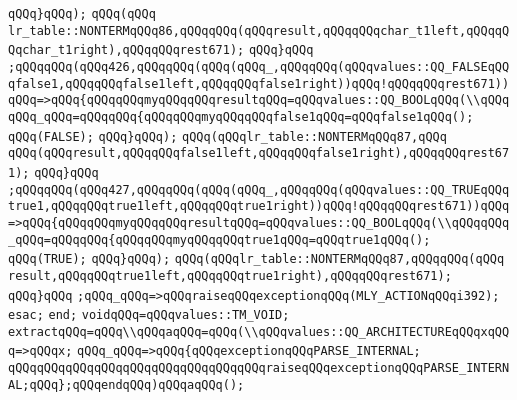 \verb|qQQq}qQQq);|\newline
\verb|qQQq(qQQq|\newline
\verb|lr_table::NONTERMqQQq86,qQQqqQQq(qQQqresult,qQQqqQQqchar_t1left,qQQqqQQqchar_t1right),qQQqqQQqrest671);|\newline
\verb|qQQq}qQQq|\newline
\verb|;qQQqqQQq(qQQq426,qQQqqQQq(qQQq(qQQq_,qQQqqQQq(qQQqvalues::QQ_FALSEqQQqfalse1,qQQqqQQqfalse1left,qQQqqQQqfalse1right))qQQq!qQQqqQQqrest671))qQQq=>qQQq{qQQqqQQqmyqQQqqQQqresultqQQq=qQQqvalues::QQ_BOOLqQQq(\\qQQqqQQq_qQQq=qQQqqQQq{qQQqqQQqmyqQQqqQQqfalse1qQQq=qQQqfalse1qQQq();|\newline
\verb|qQQq(FALSE);|\newline
\verb|qQQq}qQQq);|\newline
\verb|qQQq(qQQqlr_table::NONTERMqQQq87,qQQq|\newline
\verb|qQQq(qQQqresult,qQQqqQQqfalse1left,qQQqqQQqfalse1right),qQQqqQQqrest671);|\newline
\verb|qQQq}qQQq|\newline
\verb|;qQQqqQQq(qQQq427,qQQqqQQq(qQQq(qQQq_,qQQqqQQq(qQQqvalues::QQ_TRUEqQQqtrue1,qQQqqQQqtrue1left,qQQqqQQqtrue1right))qQQq!qQQqqQQqrest671))qQQq=>qQQq{qQQqqQQqmyqQQqqQQqresultqQQq=qQQqvalues::QQ_BOOLqQQq(\\qQQqqQQq_qQQq=qQQqqQQq{qQQqqQQqmyqQQqqQQqtrue1qQQq=qQQqtrue1qQQq();|\newline
\verb|qQQq(TRUE);|\newline
\verb|qQQq}qQQq);|\newline
\verb|qQQq(qQQqlr_table::NONTERMqQQq87,qQQqqQQq(qQQq|\newline
\verb|result,qQQqqQQqtrue1left,qQQqqQQqtrue1right),qQQqqQQqrest671);|\newline
\verb|qQQq}qQQq|\newline
\verb|;qQQq_qQQq=>qQQqraiseqQQqexceptionqQQq(MLY_ACTIONqQQqi392);|\newline
\verb|esac;|\newline
\verb|end;|\newline
\verb|voidqQQq=qQQqvalues::TM_VOID;|\newline
\verb|extractqQQq=qQQq\\qQQqaqQQq=qQQq(\\qQQqvalues::QQ_ARCHITECTUREqQQqxqQQq=>qQQqx;|\newline
\verb|qQQq_qQQq=>qQQq{qQQqexceptionqQQqPARSE_INTERNAL;|\newline
\verb|qQQqqQQqqQQqqQQqqQQqqQQqqQQqqQQqqQQqraiseqQQqexceptionqQQqPARSE_INTERNAL;qQQq};qQQqendqQQq)qQQqaqQQq();|\newline
